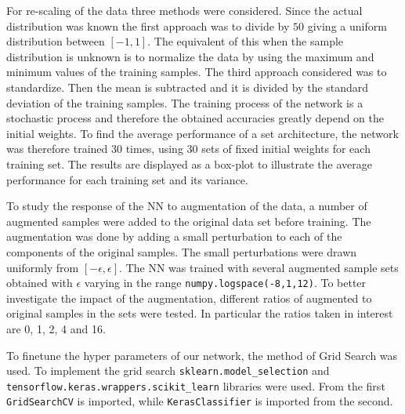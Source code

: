\documentclass[prl,twocolumn]{revtex4-1}
\begin{document}
For re-scaling of the data three methods were considered. Since the actual distribution was known the first approach was to divide by $50$ giving a uniform distribution between $[-1,1]$. The equivalent of this when the sample distribution is unknown is to normalize the data by using the maximum and minimum values of the training samples. The third approach considered was to standardize. Then the mean is subtracted and it is divided by the standard deviation of the training samples.
\vskip 4pt
The training process of the network is a stochastic process and therefore the obtained accuracies greatly depend on the initial weights. To find the average performance of a set architecture, the network was therefore trained 30 times, using 30 sets of fixed initial weights for each training set. The results are displayed as a box-plot to illustrate the average performance for each training set and its variance. %

To study the response of the NN to augmentation of the data, a number of augmented samples were added to the original data set before training. The augmentation was done by adding a small perturbation to each of the components of the original samples. The small perturbations were drawn uniformly from $[-\epsilon, \epsilon]$.
The NN was trained with several augmented sample sets obtained with $\epsilon$ varying in the range \texttt{numpy.logspace(-8,1,12)}. To better investigate the impact of the augmentation, different ratios of augmented to original samples in the sets were tested. In particular the ratios taken in interest are 0, 1, 2, 4 and 16.



\vskip 4pt
To finetune the hyper parameters of our network, the method of Grid Search was used. To implement the grid search \texttt{sklearn.model\_selection} and \texttt{tensorflow.keras.wrappers.scikit\_learn} libraries were used. From the first \texttt{GridSearchCV} is imported, while \texttt{KerasClassifier} is imported from the second.
\end{document}
